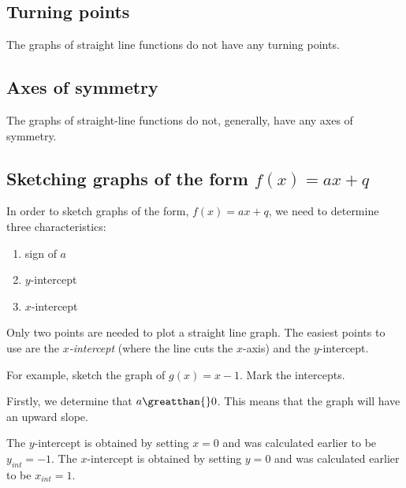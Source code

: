\subsection*{ Turning points}
\nopagebreak
\label{m39338*id239341}The graphs of straight line functions do not have any turning points.\par 
\label{m39338*uid88}
\subsection{ Axes of symmetry}
\nopagebreak
\label{m39338*id239358}The graphs of straight-line functions do not, generally, have any axes of symmetry.\par 
\label{m39338*uid89}
\subsection*{ Sketching graphs of the form $f\left(x\right)=ax+q$}
\nopagebreak
\label{m39338*id239401}In order to sketch graphs of the form, $f\left(x\right)=ax+q$, we need to determine three characteristics:\par 
\label{m39338*id239434}\begin{enumerate}[noitemsep, label=\textbf{\arabic*}. ] 
\label{m39338*uid90}\item sign of $a$\label{m39338*uid91}\item $y$-intercept
\label{m39338*uid92}\item $x$-intercept
\end{enumerate}
\label{m39338*id239497}Only two points are needed to plot a straight line graph. The easiest points to use are the \textsl{$x$-intercept} (where the line cuts the $x$-axis) and the $y$-intercept.\par 
\label{m39338*id239534}For example, sketch the graph of $g\left(x\right)=x-1$. Mark the intercepts.\par 
\label{m39338*id239565}Firstly, we determine that $a\greatthan{}0$. This means that the graph will have an upward slope.\par 
\label{m39338*id239585}The $y$-intercept is obtained by setting $x=0$ and was calculated earlier to be ${y}_{int}=-1$. The $x$-intercept is obtained by setting $y=0$ and was calculated earlier to be ${x}_{int}=1$.\par 
\setcounter{subfigure}{0}
